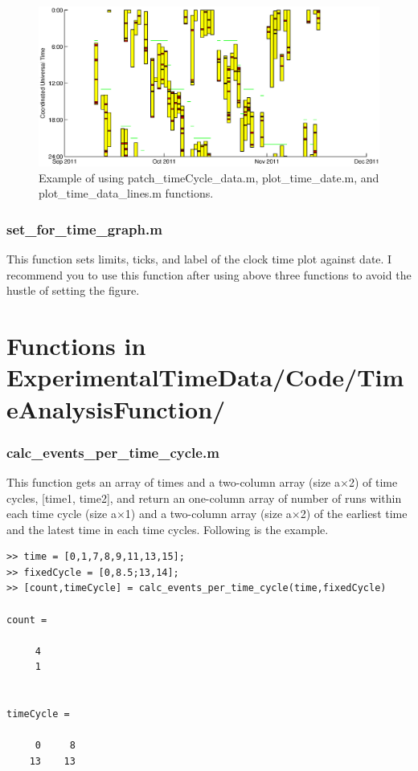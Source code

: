 \documentclass[12pt]{report}
\begin{document}
\begin{figure}
  \includegraphics[scale=0.6]{eventTime_sim_example.eps}
  \caption{Example of using patch\_timeCycle\_data.m, plot\_time\_date.m, and plot\_time\_data\_lines.m functions.}
  \label{time_plot}
\end{figure}

\subsection{set\_for\_time\_graph.m}
This function sets limits, ticks, and label of the clock time plot against date. I recommend you to use this function after using above three functions to avoid the hustle of setting the figure. 

\chapter{Functions in ExperimentalTimeData/Code/TimeAnalysisFunction/}
\subsection{calc\_events\_per\_time\_cycle.m}
This function gets an array of times and a two-column array (size a$\times$2) of time cycles, [time1, time2], and return an one-column array of number of runs within each time cycle (size a$\times$1) and a two-column array (size a$\times$2) of the earliest time and the latest time in each time cycles. Following is the example.

\begin{verbatim}
>> time = [0,1,7,8,9,11,13,15];
>> fixedCycle = [0,8.5;13,14];
>> [count,timeCycle] = calc_events_per_time_cycle(time,fixedCycle)

count =

     4
     1


timeCycle =

     0     8
    13    13
\end{verbatim}
\end{document}
